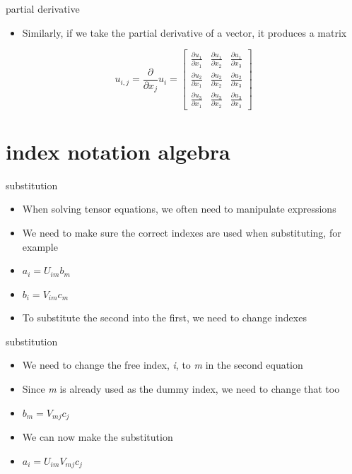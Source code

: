 \documentclass[
  letterpaper,
  ignorenonframetext,
  aspectratio=43,
  handout,
  12pt]{beamer}
\providecommand{\tightlist}{%
  \setlength{\itemsep}{0pt}\setlength{\parskip}{0pt}}
\providecommand{\tightlist}{%
\setlength{\itemsep}{0pt}\setlength{\parskip}{0pt}}
\begin{document}
\begin{frame}{partial derivative}
\protect\hypertarget{partial-derivative-1}{}
\begin{itemize}
\tightlist
\item
  Similarly, if we take the partial derivative of a vector, it produces
  a matrix
\end{itemize}

\[u_{i,j} = \frac{\partial}{\partial x_j} u_i = \begin{bmatrix}
\frac{\partial u_1}{\partial x_1} & \frac{\partial u_1}{\partial x_2} & \frac{\partial u_1}{\partial x_3}\\
\frac{\partial u_2}{\partial x_1} & \frac{\partial u_2}{\partial x_2} & \frac{\partial u_2}{\partial x_3}\\
\frac{\partial u_3}{\partial x_1} & \frac{\partial u_3}{\partial x_2} & \frac{\partial u_3}{\partial x_3}
\end{bmatrix}\]
\end{frame}

\hypertarget{index-notation-algebra}{%
\section{index notation algebra}\label{index-notation-algebra}}

\begin{frame}{substitution}
\protect\hypertarget{substitution}{}
\begin{itemize}
\tightlist
\item
  When solving tensor equations, we often need to manipulate expressions
\item
  We need to make sure the correct indexes are used when substituting,
  for example
\item
  \(a_i = U_{im}b_m\)
\item
  \(b_i = V_{im}c_m\)
\item
  To substitute the second into the first, we need to change indexes
\end{itemize}
\end{frame}

\begin{frame}{substitution}
\protect\hypertarget{substitution-1}{}
\begin{itemize}
\tightlist
\item
  We need to change the free index, \emph{i}, to \emph{m} in the second
  equation
\item
  Since \emph{m} is already used as the dummy index, we need to change
  that too
\item
  \(b_m = V_{mj}c_j\)
\item
  We can now make the substitution
\item
  \(a_i = U_{im} V_{mj}c_j\)
\end{itemize}
\end{frame}
\end{document}
